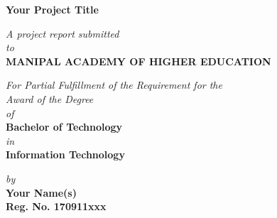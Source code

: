 \documentclass[runningheads,a4paper,12pt]{report}
\begin{document}


\begin{titlepage}
	\begin{center}
	\large{\textbf{Your Project Title}}
	\end{center}
	
	\begin{center}
	\small{\textit{A project report submitted} \\ \textit{to} \\\textbf{MANIPAL ACADEMY OF HIGHER EDUCATION} \\}
	\end{center}
	

	\vspace{-0.5cm}
	\begin{center}
	\small{\textit{For Partial Fulfillment of the Requirement for the\\ Award of the Degree\\of}} \\
	\textbf{Bachelor of Technology} \\ \textit{in} \\ \textbf{Information Technology}
	\end{center}
	
	\begin{center}
	\small{\textit{by}} \\
	\textbf{Your Name(s)} \\ \textbf{Reg. No. 170911xxx} \\
	\end{center}


\end{titlepage}
\end{document}
